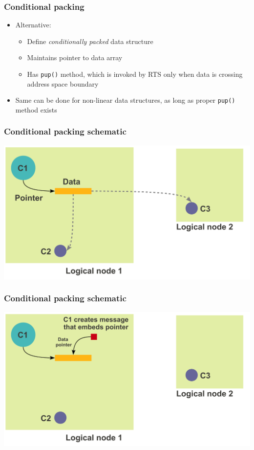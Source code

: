 \begin{frame}[fragile]
  \frametitle{Conditional packing}
  \begin{itemize}
  \item Alternative:
    \begin{itemize}
    \item Define {\em conditionally packed} data structure
    \item Maintains pointer to data array
    \item Has {\tt pup()} method, which is invoked by RTS only when data is crossing address space boundary
    \end{itemize}
  \item Same can be done for non-linear data structures, as long as proper {\tt pup()} method exists
  \end{itemize}
\end{frame}

\begin{frame}[fragile]
  \frametitle{Conditional packing schematic}
  \includegraphics[width=\textwidth]{figures/advancedOpts/fig1}
\end{frame}

\begin{frame}[fragile]
  \frametitle{Conditional packing schematic}
  \includegraphics[width=\textwidth]{figures/advancedOpts/fig2}
\end{frame}

